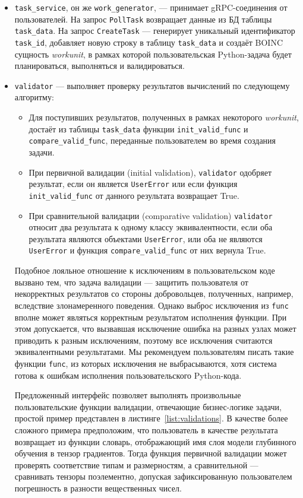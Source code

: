 \documentclass[a4paper,12pt]{extarticle}
\begin{document}
\begin{itemize}
    \item \texttt{task\_service}, он же \texttt{work\_generator}, — принимает gRPC-соединения от пользователей.
    На запрос \texttt{PollTask} возвращает данные из БД таблицы \texttt{task\_data}.
    На запрос \texttt{CreateTask} — генерирует уникальный идентификатор \texttt{task\_id}, добавляет новую строку в таблицу \texttt{task\_data} и создаёт BOINC сущность \textit{workunit}, в рамках которой пользовательская Python-задача будет планироваться, выполняться и валидироваться.

    \item \texttt{validator} — выполняет проверку результатов вычислений по следующему алгоритму:
    \begin{itemize}
        \item Для поступивших результатов, полученных в рамках некоторого \textit{workunit}, достаёт из таблицы \texttt{task\_data} функции \texttt{init\_valid\_func} и \texttt{compare\_valid\_func}, переданные пользователем во время создания задачи.
        \item При первичной валидации (initial validation), \texttt{validator} одобряет результат, если он является \texttt{UserError} или если функция \texttt{init\_valid\_func} от данного результата возвращает True.
        \item При сравнительной валидации (comparative validation) \texttt{validator} относит два результата к одному классу эквивалентности, если оба результата являются объектами \texttt{UserError}, или оба не являются \texttt{UserError} и функция \texttt{compare\_valid\_func} от них вернула True.
    \end{itemize}

    Подобное лояльное отношение к исключениям в пользовательском коде вызвано тем, что задача валидации — защитить пользователя от некорректных результатов со стороны добровольцев, полученных, например, вследствие злонамеренного поведения.
    Однако выброс исключения из \texttt{func} вполне может являться корректным результатом исполнения функции.
    При этом допускается, что вызвавшая исключение ошибка на разных узлах может приводить к разным исключениям, поэтому все исключения считаются эквивалентными результатами.
    Мы рекомендуем пользователям писать такие функции \texttt{func}, из которых исключения не выбрасываются, хотя система готова к ошибкам исполнения пользовательского Python-кода.

    Предложенный интерфейс позволяет выполнять произвольные пользовательские функции валидации, отвечающие бизнес-логике задачи, простой пример представлен в листинге~\ref{list:validations}.
    В качестве более сложного примера предположим, что пользователь в качестве результата возвращает из функции словарь, отображающий имя слоя модели глубинного обучения в тензор градиентов.
    Тогда функция первичной валидации может проверять соответствие типам и размерностям, а сравнительной — сравнивать тензоры поэлементно, допуская зафиксированную пользователем погрешность в разности вещественных чисел.


\end{itemize}
\end{document}
